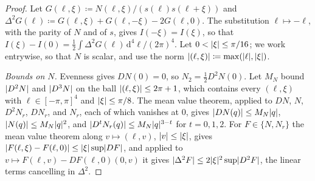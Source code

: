 \documentclass[11pt]{preprint}
\newcommand{\dd}{\mathrm{d}}
\DeclarePairedDelimiter{\abs}{\lvert}{\rvert}
\numberwithin{equation}{section}
\theoremstyle{definition}
\theoremstyle{remark}
\theoremstyle{plain}
\begin{document}
\begin{proof}
Let $G(\ell, \xi) \coloneqq N(\ell, \xi)/(s(\ell)s(\ell + \xi))$ and $\Delta^2G(\ell) \coloneqq G(\ell, \xi) + G(\ell, -\xi) - 2G(\ell, 0)$. The substitution $\ell \mapsto -\ell$, with the parity of $N$ and of $s$, gives $I(-\xi) = I(\xi)$, so that $I(\xi) - I(0) = \frac12\int\Delta^2G(\ell)\,\dd^4\ell/(2\pi)^4$. Let $0 < \abs{\xi} \leq \pi/16$; we work entrywise, so that $N$ is scalar, and use the norm $\abs{(\ell, \xi)} \coloneqq \max(\abs{\ell}, \abs{\xi})$.

\emph{Bounds on $N$.} Evenness gives $DN(0) = 0$, so $N_2 = \frac12D^2N(0)$. Let $M_N$ bound $\abs{D^2N}$ and $\abs{D^3N}$ on the ball $\abs{(\ell, \xi)} \leq 2\pi + 1$, which contains every $(\ell, \xi)$ with $\ell \in [-\pi, \pi]^4$ and $\abs{\xi} \leq \pi/8$. The mean value theorem, applied to $DN$, $N$, $D^2N_r$, $DN_r$, and $N_r$, each of which vanishes at $0$, gives $\abs{DN(q)} \leq M_N\abs{q}$, $\abs{N(q)} \leq M_N\abs{q}^2$, and $\abs{D^tN_r(q)} \leq M_N\abs{q}^{3-t}$ for $t = 0, 1, 2$. For $F \in \{ N, N_r \}$ the mean value theorem along $v \mapsto (\ell, v)$, $\abs{v} \leq \abs{\xi}$, gives $\abs{F(\ell, \xi) - F(\ell, 0)} \leq \abs{\xi}\sup\abs{DF}$, and applied to $v \mapsto F(\ell, v) - DF(\ell, 0)(0, v)$ it gives $\abs{\Delta^2F} \leq 2\abs{\xi}^2\sup\abs{D^2F}$, the linear terms cancelling in $\Delta^2$.


\end{proof}
\end{document}
